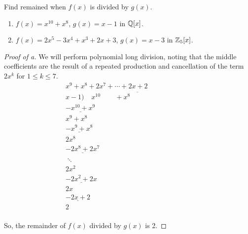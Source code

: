 \documentclass[../hw5]{subfiles}
\begin{document}
\begin{problem}
Find remained when $f(x)$ is divided by  $g(x)$.
\begin{enumerate}[label=\roman*)]
	\item $f(x)=x^{10}+x^8$, $g(x)=x-1$ in  $\mathbb{Q}[x]$.
	\item $f(x)=2x^5-3x^4+x^3+2x+3$,  $g(x)=x-3$ in  $\mathbb{Z}_5[x]$.
\end{enumerate}
\end{problem}
\begin{proof}[Proof of a]
	We will perform polynomial long division, noting that the middle coefficients are the result of a repeated production and cancellation of the term $2x^k$ for $1\le k\le 7$.
	\[\begin{array}{r}
			x^9+x^8+2x^7+\cdots+2x+2                                                                   \\
			x-1 \big) \overline{\phantom{aa}  x^{10}\phantom{+x^90}+x^8\phantom{+0x^7+\cdots+0x+00}  } \\
			\underline{ -x^{10}+x^9 }\phantom{+x^8+0x^7+\cdots+0x+00}                                  \\
			x^9+x^8\phantom{+0x^7+\cdots+0x+00}                                                        \\
			\underline{-x^9+x^8}\phantom{+0x^7+\cdots+0x+00}                                           \\
			2x^8\phantom{+0x^7+\cdots+0x+00}                                                           \\
			\underline{-2x^8+2x^7}\phantom{+\cdots+0x+0.}                                              \\
			\ddots \phantom{+0x^2+0x+}                                                                 \\
			2x^2\phantom{+0x+00}                                                                       \\
			\underline{-2x^2+2x}\phantom{+00}                                                          \\
			2x \phantom{+00}                                                                           \\
			\underline{ -2x+2 }                                                                        \\
			2                                                                                          \\
		\end{array}\]

	So, the remainder of $f(x)$  divided by $g(x)$ is 2.
\end{proof}
\end{document}
